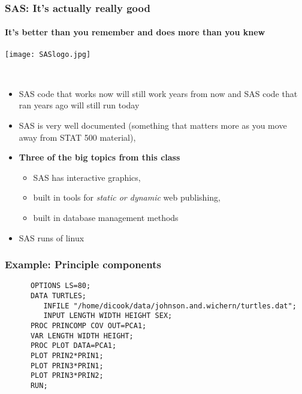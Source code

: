 \documentclass[xcolor=dvipsnames,gray,mathserif]{beamer}
\begin{document}
\begin{frame}
   \frametitle{SAS: It's actually really good}
   \framesubtitle{It's better than you remember and does more than you knew}
   \centerline{\texttt{[image: SASlogo.jpg]}}\\
   \begin{itemize}
      \item SAS code that works now will still work years from now and SAS
         code that ran years ago will still run today 
         \vspace{.2cm}

      \item SAS is very well documented (something that matters 
            more as you move away from STAT 500 material),
         \vspace{.2cm}

         \item \textbf{Three of the big topics from this class}
            \begin{itemize}
               \item SAS has interactive graphics, \\
               \item built in tools for \textit{static or dynamic} web publishing, \\
               \item built in database management methods 
            \end{itemize}
         \vspace{.2cm}

         \item SAS runs of linux
   \end{itemize}
\end{frame}

\begin{frame}[fragile]
   \frametitle{Example: Principle components}
   \begin{verbatim}
      OPTIONS LS=80;
      DATA TURTLES;
         INFILE "/home/dicook/data/johnson.and.wichern/turtles.dat";
         INPUT LENGTH WIDTH HEIGHT SEX;
      PROC PRINCOMP COV OUT=PCA1;
      VAR LENGTH WIDTH HEIGHT;
      PROC PLOT DATA=PCA1;
      PLOT PRIN2*PRIN1;
      PLOT PRIN3*PRIN1;
      PLOT PRIN3*PRIN2;
      RUN;
   \end{verbatim}
\end{frame}
\end{document}
